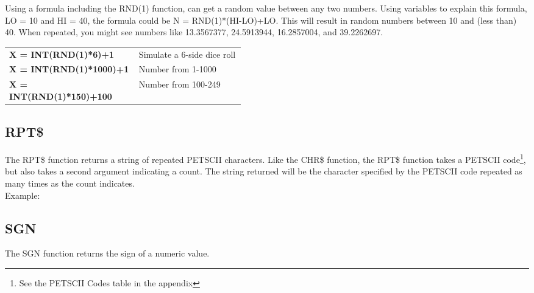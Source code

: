 Using a formula including the {\ttfamily RND(1)} function, can get a random
value between any two numbers.  Using variables to explain this formula,
{\ttfamily LO = 10} and {\ttfamily HI = 40}, the formula could be {\ttfamily N
= RND(1)*(HI-LO)+LO}.  This will result in random numbers between 10 and (less
than) 40. When repeated, you might see numbers like 13.3567377, 24.5913944,
16.2857004, and 39.2262697.\\

\begin{tabular}{l p{0.45\linewidth}}

	{\ttfamily\bfseries X = INT(RND(1)*6)+1} & Simulate a 6-side dice roll\\

	{\ttfamily\bfseries X = INT(RND(1)*1000)+1} & Number from 1-1000\\

	{\ttfamily\bfseries X = INT(RND(1)*150)+100} & Number from 100-249\\

\end{tabular}

\vspace{16pt}

\subsection{RPT\$}

The {\ttfamily RPT\$} function returns a string of repeated PETSCII characters.
Like the {\ttfamily CHR\$} function, the {\ttfamily RPT\$} function takes a
PETSCII code\footnote{See the PETSCII Codes table in the appendix}, but also
takes a second argument indicating a count.  The string returned will be the
character specified by the PETSCII code repeated as many times as the count
indicates.\\

Example:\\


\subsection{SGN}

The {\ttfamily SGN} function returns the sign of a numeric value.\\

